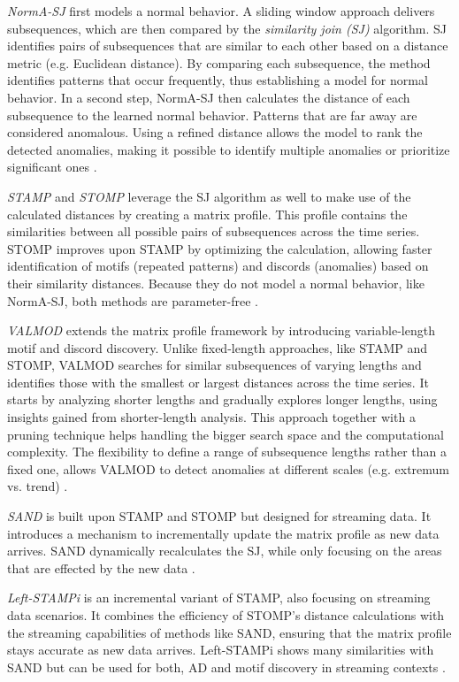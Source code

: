 \textit{NormA-SJ} first models a normal behavior. A sliding window approach delivers subsequences, which are then compared by the \textit{similarity join (SJ)} algorithm. SJ identifies pairs of subsequences that are similar to each other based on a distance metric (e.g. Euclidean distance). By comparing each subsequence, the method identifies patterns that occur frequently, thus establishing a model for normal behavior. In a second step, NormA-SJ then calculates the distance of each subsequence to the learned normal behavior. Patterns that are far away are considered anomalous. Using a refined distance allows the model to rank the detected anomalies, making it possible to identify multiple anomalies or prioritize significant ones \cite{NormA-SJ}.

\textit{STAMP} and \textit{STOMP} leverage the SJ algorithm as well to make use of the calculated distances by creating a matrix profile. This profile contains the similarities between all possible pairs of subsequences across the time series. STOMP improves upon STAMP by optimizing the calculation, allowing faster identification of motifs (repeated patterns) and discords (anomalies) based on their similarity distances. Because they do not model a normal behavior, like NormA-SJ, both methods are parameter-free \cite{STAMP, STOMP}.

\textit{VALMOD} extends the matrix profile framework by introducing variable-length motif and discord discovery. Unlike fixed-length approaches, like STAMP and STOMP, VALMOD searches for similar subsequences of varying lengths and identifies those with the smallest or largest distances across the time series. It starts by analyzing shorter lengths and gradually explores longer lengths, using insights gained from shorter-length analysis. This approach together with a pruning technique helps handling the bigger search space and the computational complexity. The flexibility to define a range of subsequence lengths rather than a fixed one, allows VALMOD to detect anomalies at different scales (e.g. extremum vs. trend) \cite{VALMOD}.

\textit{SAND} is built upon STAMP and STOMP but designed for streaming data. It introduces a mechanism to incrementally update the matrix profile as new data arrives. SAND dynamically recalculates the SJ, while only focusing on the areas that are effected by the new data \cite{SAND}.

\textit{Left-STAMPi} is an incremental variant of STAMP, also focusing on streaming data scenarios. It combines the efficiency of STOMP's distance calculations with the streaming capabilities of methods like SAND, ensuring that the matrix profile stays accurate as new data arrives. Left-STAMPi shows many similarities with SAND but can be used for both, AD and motif discovery in streaming contexts \cite{STAMP}.

